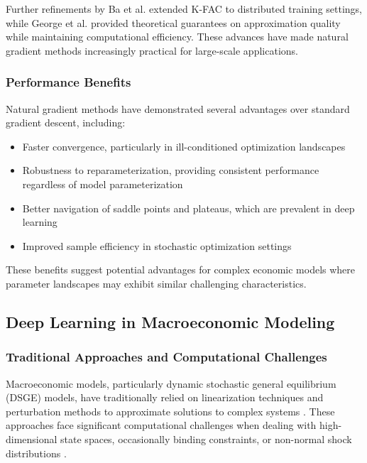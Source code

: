 \documentclass[a4paper]{article}
\begin{document}
Further refinements by Ba et al. \cite{ba2017distributed} extended K-FAC to distributed training settings, while George et al. \cite{george2018fast} provided theoretical guarantees on approximation quality while maintaining computational efficiency. These advances have made natural gradient methods increasingly practical for large-scale applications.

\subsubsection{Performance Benefits}
Natural gradient methods have demonstrated several advantages over standard gradient descent, including:
\begin{itemize}
    \item Faster convergence, particularly in ill-conditioned optimization landscapes \cite{martens2015optimizing}
    \item Robustness to reparameterization, providing consistent performance regardless of model parameterization \cite{amari1998natural}
    \item Better navigation of saddle points and plateaus, which are prevalent in deep learning \cite{dauphin2014identifying}
    \item Improved sample efficiency in stochastic optimization settings \cite{kunstner2019limitations}
\end{itemize}

These benefits suggest potential advantages for complex economic models where parameter landscapes may exhibit similar challenging characteristics.

\subsection{Deep Learning in Macroeconomic Modeling}

\subsubsection{Traditional Approaches and Computational Challenges}
Macroeconomic models, particularly dynamic stochastic general equilibrium (DSGE) models, have traditionally relied on linearization techniques and perturbation methods to approximate solutions to complex systems \cite{fernandez2016solution}. These approaches face significant computational challenges when dealing with high-dimensional state spaces, occasionally binding constraints, or non-normal shock distributions \cite{judd2017solution}.
\end{document}
